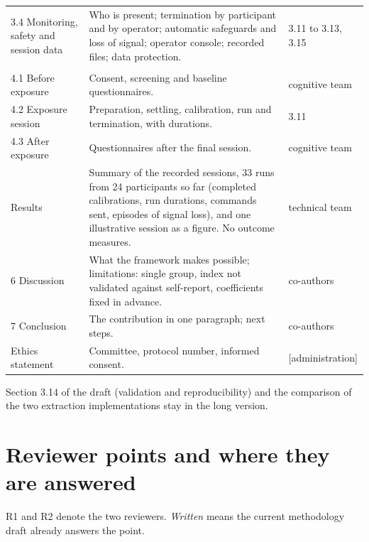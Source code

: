 \documentclass[11pt,a4paper]{article}
\newcommand{\ph}[1]{\textcolor{red!65!black}{[#1]}}
\begin{document}
\begin{longtable}{@{}L{3.4cm}L{8.6cm}L{3.6cm}@{}}
3.4 Monitoring, safety and session data &
    Who is present; termination by participant and by operator;
    automatic safeguards and loss of signal; operator console; recorded
    files; data protection. &
    3.11 to 3.13, 3.15 \\
\addlinespace[3pt]
 \\
4.1 Before exposure &
    Consent, screening and baseline questionnaires. &
    cognitive team \\
4.2 Exposure session &
    Preparation, settling, calibration, run and termination, with
    durations. &
    3.11 \\
4.3 After exposure &
    Questionnaires after the final session. &
    cognitive team \\
 Results &
    Summary of the recorded sessions, 33 runs from 24 participants so
    far (completed calibrations, run durations, commands sent, episodes
    of signal loss), and one illustrative session as a figure. No
    outcome measures. &
    technical team \\
6 Discussion &
    What the framework makes possible; limitations: single group, index
    not validated against self-report, coefficients fixed in advance. &
    co-authors \\
7 Conclusion &
    The contribution in one paragraph; next steps. &
    co-authors \\
Ethics statement &
    Committee, protocol number, informed consent. &
    \ph{administration} \\
\end{longtable}

Section 3.14 of the draft (validation and reproducibility) and the
comparison of the two extraction implementations stay in the long
version.

\section{Reviewer points and where they are answered}
\label{sec:reviewers}

R1 and R2 denote the two reviewers. \emph{Written} means the current
methodology draft already answers the point.
\end{document}
